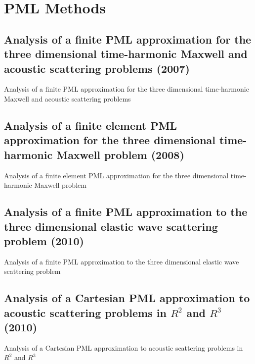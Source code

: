 \chapter{PML Methods}

\section{Analysis of a finite PML approximation for the three dimensional time-harmonic Maxwell and acoustic scattering problems (2007)}
Analysis of a finite PML approximation for the three dimensional time-harmonic Maxwell and acoustic scattering problems\cite{bramble2007analysis}



\section{Analysis of a finite element PML approximation for the three dimensional time-harmonic Maxwell problem (2008)}
Analysis of a finite element PML approximation for the three dimensional time-harmonic Maxwell problem \cite{bramble2008analysis}




\section{Analysis of a finite PML approximation to the three dimensional elastic wave scattering problem (2010)}
Analysis of a finite PML approximation to the three dimensional elastic wave scattering problem \cite{bramble2010analysis}



\section{Analysis of a Cartesian PML approximation to acoustic scattering problems in $R^2$ and $R^3$ (2010)}
Analysis of a Cartesian PML approximation to acoustic scattering problems in $R^2$ and $R^3$ \cite{bramble2013analysis}
